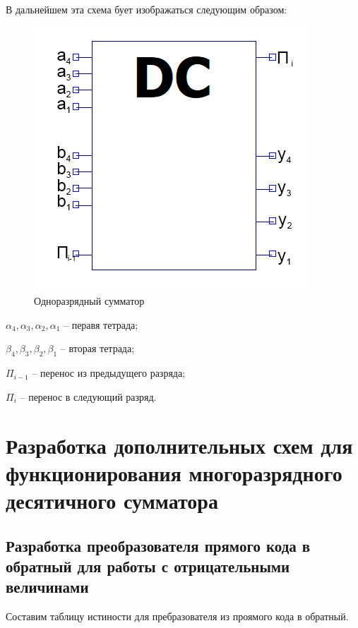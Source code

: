 \documentclass[a4paper,14pt]{article}
\begin{document}

В дальнейшем эта схема бует изображаться следующим образом:

\begin{figure}[H]
	\centering
	\includegraphics[width=0.2\linewidth]{images/odnSum_el}
	\caption{Одноразрядный сумматор}
	\label{fig:odnSum_el}
\end{figure}

$\alpha_4, \alpha_3, \alpha_2, \alpha_1$ -- перавя тетрада;

$\beta_4, \beta_3, \beta_2, \beta_1$ -- вторая тетрада;

$\Pi_{i-1}$ -- перенос из предыдущего разряда;

$\Pi_i$ -- перенос в следующий разряд.

\section{Разработка дополнительных схем для функционирования многоразрядного десятичного сумматора}

\subsection{Разработка преобразователя прямого кода в обратный для работы с отрицательными величинами}

Составим таблицу истиности для пребразователя из проямого кода в обратный.
\end{document}
